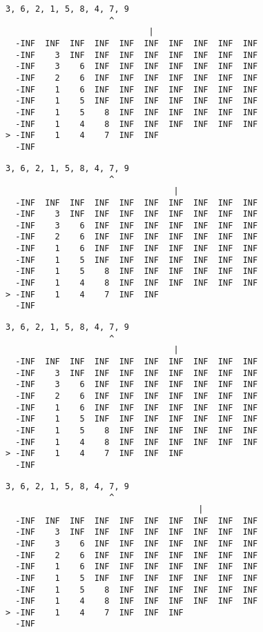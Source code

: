 { \begin{verbatim}
3, 6, 2, 1, 5, 8, 4, 7, 9
                     ^
                             |
  -INF  INF  INF  INF  INF  INF  INF  INF  INF  INF
  -INF    3  INF  INF  INF  INF  INF  INF  INF  INF
  -INF    3    6  INF  INF  INF  INF  INF  INF  INF
  -INF    2    6  INF  INF  INF  INF  INF  INF  INF
  -INF    1    6  INF  INF  INF  INF  INF  INF  INF
  -INF    1    5  INF  INF  INF  INF  INF  INF  INF
  -INF    1    5    8  INF  INF  INF  INF  INF  INF
  -INF    1    4    8  INF  INF  INF  INF  INF  INF
> -INF    1    4    7  INF  INF                    
  -INF                                             
\end{verbatim} }

{ \begin{verbatim}
3, 6, 2, 1, 5, 8, 4, 7, 9
                     ^
                                  |
  -INF  INF  INF  INF  INF  INF  INF  INF  INF  INF
  -INF    3  INF  INF  INF  INF  INF  INF  INF  INF
  -INF    3    6  INF  INF  INF  INF  INF  INF  INF
  -INF    2    6  INF  INF  INF  INF  INF  INF  INF
  -INF    1    6  INF  INF  INF  INF  INF  INF  INF
  -INF    1    5  INF  INF  INF  INF  INF  INF  INF
  -INF    1    5    8  INF  INF  INF  INF  INF  INF
  -INF    1    4    8  INF  INF  INF  INF  INF  INF
> -INF    1    4    7  INF  INF                    
  -INF                                             
\end{verbatim} }

{ \begin{verbatim}
3, 6, 2, 1, 5, 8, 4, 7, 9
                     ^
                                  |
  -INF  INF  INF  INF  INF  INF  INF  INF  INF  INF
  -INF    3  INF  INF  INF  INF  INF  INF  INF  INF
  -INF    3    6  INF  INF  INF  INF  INF  INF  INF
  -INF    2    6  INF  INF  INF  INF  INF  INF  INF
  -INF    1    6  INF  INF  INF  INF  INF  INF  INF
  -INF    1    5  INF  INF  INF  INF  INF  INF  INF
  -INF    1    5    8  INF  INF  INF  INF  INF  INF
  -INF    1    4    8  INF  INF  INF  INF  INF  INF
> -INF    1    4    7  INF  INF  INF               
  -INF                                             
\end{verbatim} }

{ \begin{verbatim}
3, 6, 2, 1, 5, 8, 4, 7, 9
                     ^
                                       |
  -INF  INF  INF  INF  INF  INF  INF  INF  INF  INF
  -INF    3  INF  INF  INF  INF  INF  INF  INF  INF
  -INF    3    6  INF  INF  INF  INF  INF  INF  INF
  -INF    2    6  INF  INF  INF  INF  INF  INF  INF
  -INF    1    6  INF  INF  INF  INF  INF  INF  INF
  -INF    1    5  INF  INF  INF  INF  INF  INF  INF
  -INF    1    5    8  INF  INF  INF  INF  INF  INF
  -INF    1    4    8  INF  INF  INF  INF  INF  INF
> -INF    1    4    7  INF  INF  INF               
  -INF                                             
\end{verbatim} }

